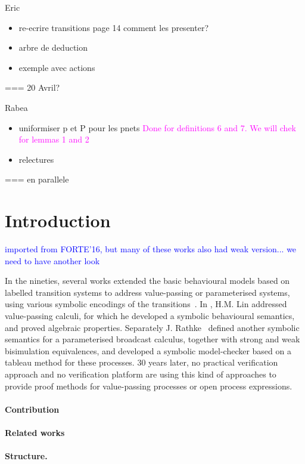 \documentclass{lncs/llncs}
\newcommand{\ERIC}[1]{\textcolor{blue}{#1}}
\newcommand{\RAB}[1]{\textcolor{magenta}{#1}}
\begin{document}
Eric
\begin{itemize}
\item re-ecrire transitions page 14 comment les presenter?
\item arbre de deduction
\item exemple avec actions
\end{itemize}
=== 20 Avril?
\medskip

Rabea
\begin{itemize}
\item uniformiser p et P pour les pnets \RAB{Done for definitions 6 and 7. We will chek for lemmas 1 and 2}
\item relectures
\end{itemize}
=== en parallele

\section{Introduction}

\ERIC{imported from FORTE'16, but many of these works also had weak
  version... we need to have another look}

In the nineties, several 
works extended the basic behavioural models based on labelled
transition systems to address value-passing or parameterised systems, using
various symbolic encodings of the
transitions~\cite{deSimone85,Larsen87,HennessyLin:TCS95,Linconcur96}. 
In \cite{Linconcur96}, H.M. Lin addressed value-passing calculi, for which he
developed a symbolic behavioural semantics, and proved algebraic properties.
Separately J. Rathke~\cite{HennessyRathke:TCS98} defined another
symbolic semantics for 
a parameterised broadcast calculus, together with strong and weak bisimulation
equivalences, and developed a symbolic model-checker based on a tableau
method for these processes. 30 years later, no
practical verification approach and no verification platform are
using this kind of approaches to provide proof methods for
value-passing processes or open process expressions. 

\paragraph{Contribution}

\paragraph{Related works}



\paragraph{Structure.}
\end{document}
